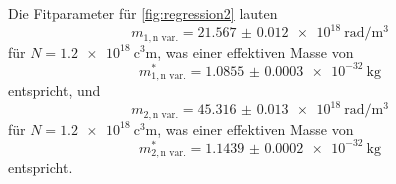 Die Fitparameter für \autoref{fig:regression2} lauten
\begin{equation*}
    m_{1, \text{n var.}} = \qty{21.567(12)e18}{\radian\per\meter\cubed} 
\end{equation*}
für $N = \qty{1.2e18}{\cubic\centi\meter}$, was einer effektiven Masse von 
\begin{equation*}
    m^*_{1, \text{n var.}} = \qty{1.0855(3)e-32}{\kilo\gram}
\end{equation*}
entspricht, und
\begin{equation*}
    m_{2, \text{n var.}} = \qty{45.316(13)e18}{\radian\per\meter\cubed} 
\end{equation*}
für $N = \qty{1.2e18}{\cubic\centi\meter}$, was einer effektiven Masse von 
\begin{equation*}
    m^*_{2, \text{n var.}} = \qty{1.1439(2)e-32}{\kilo\gram}
\end{equation*}
entspricht.